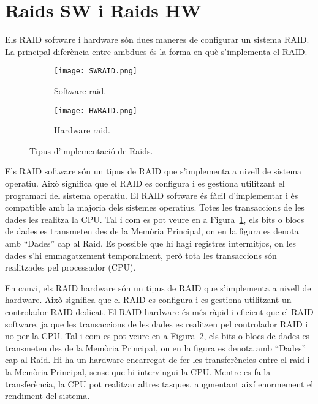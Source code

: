 \section{Raids SW i Raids HW}

Els RAID software i hardware són dues maneres de configurar un sistema RAID. La principal diferència entre ambdues és la forma en què s'implementa el RAID. 

\begin{figure}[!htb]
     \centering
     \begin{subfigure}[b]{0.4\textwidth}
         \centering
         \texttt{[image: SWRAID.png]}
         \caption{Software raid.}
         \label{fig:SWRAID}
     \end{subfigure}
     \hfill
     \begin{subfigure}[b]{0.4\textwidth}
         \centering
         \texttt{[image: HWRAID.png]}
         \caption{Hardware raid.}
         \label{fig:HWRAID}
     \end{subfigure}
        \caption{Tipus d'implementació de Raids.}
        \label{fig:implementacioRaids}
\end{figure}

Els RAID software són un tipus de RAID que s'implementa a nivell de sistema operatiu. Això significa que el RAID es configura i es gestiona utilitzant el programari del sistema operatiu. El RAID software és fàcil d'implementar i és compatible amb la majoria dels sistemes operatius. Totes les transaccions de les dades les realitza la CPU. Tal i com es pot veure en a Figura~\ref{fig:SWRAID}, els bits o blocs de dades es transmeten des de la Memòria Principal, on en la figura es denota amb ``Dades'' cap al Raid. Es possible que hi hagi registres intermitjos, on les dades s'hi emmagatzement temporalment, però tota les transaccions són realitzades pel processador (CPU).

En canvi, els RAID hardware són un tipus de RAID que s'implementa a nivell de hardware. Això significa que el RAID es configura i es gestiona utilitzant un controlador RAID dedicat. El RAID hardware és més ràpid i eficient que el RAID software, ja que les transaccions de les dades es realitzen pel controlador RAID i no per la CPU. Tal i com es pot veure en a Figura~\ref{fig:HWRAID}, els bits o blocs de dades es transmeten des de la Memòria Principal, on en la figura es denota amb ``Dades'' cap al Raid. Hi ha un hardware encarregat de fer les transferències entre el raid i la Memòria Principal, sense que hi intervingui la CPU. Mentre es fa la transferència, la CPU pot realitzar altres tasques, augmentant així enormement el rendiment del sistema.

